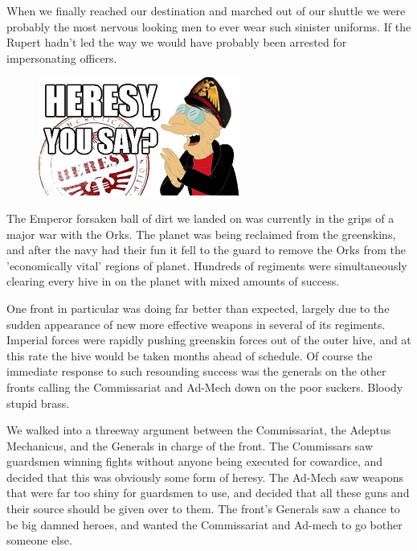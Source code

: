 When we finally reached our destination and marched out of our shuttle we were probably the most nervous looking men to ever wear such sinister uniforms. 
If the Rupert hadn't led the way we would have probably been arrested for impersonating officers.

\begin{figure}
	\begin{center}
		\includegraphics[width=\figwidth]{pics/4/7.png}
	\end{center}
\end{figure}
The Emperor forsaken ball of dirt we landed on was currently in the grips of a major war with the Orks. 
The planet was being reclaimed from the greenskins, and after the navy had their fun it fell to the guard to remove the Orks from the 'economically vital' regions of planet. %
Hundreds of regiments were simultaneously clearing every hive in on the planet with mixed amounts of success. 

One front in particular was doing far better than expected, largely due to the sudden appearance of new more effective weapons in several of its regiments.
Imperial forces were rapidly pushing greenskin forces out of the outer hive, and at this rate the hive would be taken months ahead of schedule. 
Of course the immediate response to such resounding success was the generals on the other fronts calling the Commissariat and Ad-Mech down on the poor suckers. 
Bloody stupid brass.

We walked into a threeway argument between the Commissariat, the Adeptus Mechanicus, and the Generals in charge of the front. 
The Commissars saw guardsmen winning fights without anyone being executed for cowardice, and decided that this was obviously some form of heresy. 
The Ad-Mech saw weapons that were far too shiny for guardsmen to use, and decided that all these guns and their source should be given over to them. 
The front's Generals saw a chance to be big damned heroes, and wanted the Commissariat and Ad-mech to go bother someone else.

